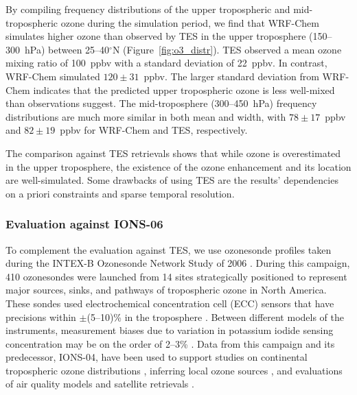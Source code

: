 By compiling frequency distributions of the upper tropospheric and mid-tropospheric ozone
during the simulation period, we find that WRF-Chem simulates higher ozone than observed by
TES in the upper troposphere (150--300~hPa) between 25--40$^\circ$N (Figure~\ref{fig:o3_distr}). TES observed a mean ozone
mixing ratio of 100~ppbv with a standard deviation of 22~ppbv. In contrast, WRF-Chem
simulated $120\pm31$~ppbv. The larger standard deviation from WRF-Chem indicates that
the predicted upper tropospheric ozone is less well-mixed than observations suggest.
The mid-troposphere (300--450~hPa) frequency distributions are much more similar in both mean
and width, with $78\pm17$~ppbv and $82\pm19$~ppbv for WRF-Chem and TES, respectively.

The comparison against TES retrievals shows that while ozone is overestimated in the upper
troposphere, the existence of the ozone enhancement and its location are well-simulated.
Some drawbacks of using TES are the results' dependencies on a priori constraints and sparse
temporal resolution.



\subsubsection{Evaluation against IONS-06}

To complement the evaluation against TES, we use ozonesonde
profiles taken during the INTEX-B Ozonesonde Network Study of 2006
\citep[IONS-06;][]{Thompson:2008rp}. During this campaign, 410 ozonesondes were
launched from 14 sites strategically positioned to represent major sources, sinks, and
pathways of tropospheric ozone in North America. These sondes used electrochemical
concentration cell (ECC) sensors that have precisions within $\pm$(5--10)\% in the
troposphere \citep{Smit:2007ta}. Between different models of the instruments,
measurement biases due to variation in potassium iodide sensing concentration may be
on the order of 2--3\% \citep{Smit:2007ta}. Data from this campaign and its predecessor,
IONS-04, have been used to support studies on continental tropospheric ozone
distributions \citep[e.g.][]{Cooper:2007cr}, inferring local ozone sources
\citep[e.g.][]{Thompson:2008rp}, and evaluations of air quality models
\citep[e.g.][]{Tarasick:2007dq} and satellite retrievals \citep[e.g.][]{Nassar:2008mw}.

